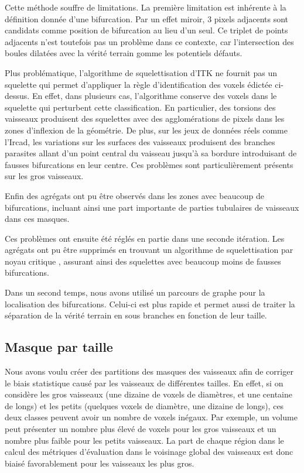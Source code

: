 Cette méthode souffre de limitations. La première limitation est inhérente à la définition donnée d'une bifurcation. Par un effet miroir, 3 pixels adjacents sont candidats comme position de bifurcation au lieu d'un seul. Ce triplet de points adjacents n'est toutefois pas un problème dans ce contexte, car l'intersection des boules dilatées avec la vérité terrain gomme les potentiels défauts.

Plus problématique, l'algorithme de squelettisation d'ITK ne fournit pas un squelette qui permet d'appliquer la règle d'identification des voxels édictée ci-dessus. En effet, dans plusieurs cas, l'algorithme conserve des voxels dans le squelette qui perturbent cette classification. En particulier, des torsions des vaisseaux produisent des squelettes avec des agglomérations de pixels dans les zones d'inflexion de la géométrie. De plus, sur les jeux de données réels comme l'Ircad, les variations sur les surfaces des vaisseaux produisent des branches parasites allant d'un point central du vaisseau jusqu'à sa bordure introduisant de fausses bifurcations en leur centre. Ces problèmes sont particulièrement présents sur les gros vaisseaux.

Enfin des agrégats ont pu être observés dans les zones avec beaucoup de bifurcations, incluant ainsi une part importante de parties tubulaires de vaisseaux dans ces masques.

Ces problèmes ont ensuite été réglés en partie dans une seconde itération. Les agrégats ont pu être supprimés en trouvant un algorithme de squelettisation par noyau critique \cite{Bertrand2006_critical_kernel}, assurant ainsi des squelettes avec beaucoup moins de fausses bifurcations.

Dans un second temps, nous avons utilisé un parcours de graphe pour la localisation des bifurcations. Celui-ci est plus rapide et permet aussi de traiter la séparation de la vérité terrain en sous branches en fonction de leur taille.

\subsection{Masque par taille}

Nous avons voulu créer des partitions des masques des vaisseaux afin de corriger le biais statistique causé par les vaisseaux de différentes tailles. En effet, si on considère les gros vaisseaux (une dizaine de voxels de diamètres, et une centaine de longs) et les petits (quelques voxels de diamètre, une dizaine de longs), ces deux classes peuvent avoir un nombre de voxels inégaux. Par exemple, un volume peut présenter un nombre plus élevé de voxels pour les gros vaisseaux et un nombre plus faible pour les petits vaisseaux. La part de chaque région dans le calcul des métriques d'évaluation dans le voisinage global des vaisseaux est donc biaisé favorablement pour les vaisseaux les plus gros.

